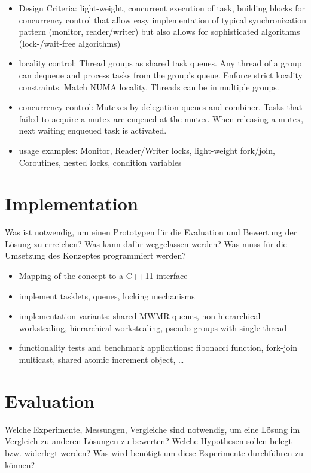 \documentclass[journal]{IEEEtran}
\begin{document}
\begin{itemize}
\item Design Criteria: light-weight, concurrent execution of task,
  building blocks for concurrency control that allow easy
  implementation of typical synchronization pattern (monitor,
  reader/writer) but also allows for sophisticated algorithms
  (lock-/wait-free algorithms)
\item locality control: Thread groups as shared task queues. Any
  thread of a group can dequeue and process tasks from the group's
  queue. Enforce strict locality constraints. Match NUMA
  locality. Threads can be in multiple groups.
\item concurrency control: Mutexes by delegation queues and
  combiner. Tasks that failed to acquire a mutex are enqeued at the
  mutex. When releasing a mutex, next waiting enqueued task is
  activated. 
\item usage examples: Monitor, Reader/Writer locks, light-weight
  fork/join, Coroutines, nested locks, condition variables
\end{itemize}


\section{Implementation}
\begin{itshape}
  Was ist notwendig, um einen Prototypen für die Evaluation und
  Bewertung der Lösung zu erreichen? Was kann dafür weggelassen
  werden? Was muss für die Umsetzung des Konzeptes programmiert
  werden?
\end{itshape}

\begin{itemize}
\item Mapping of the concept to a C++11 interface
\item implement tasklets, queues, locking mechanisms
\item implementation variants: shared MWMR queues, non-hierarchical
  workstealing, hierarchical workstealing, pseudo groups with single
  thread
\item functionality tests and benchmark applications: fibonacci
  function, fork-join multicast, shared atomic increment object,
  \ldots
\end{itemize}


\section{Evaluation}
\begin{itshape}
  Welche Experimente, Messungen, Vergleiche sind notwendig, um eine
  Lösung im Vergleich zu anderen Lösungen zu bewerten?  Welche
  Hypothesen sollen belegt bzw. widerlegt werden? Was wird benötigt um
  diese Experimente durchführen zu können?
\end{itshape}
\end{document}
